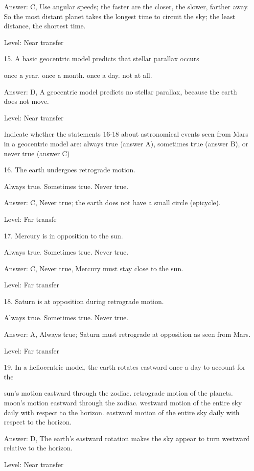Answer: C, Use angular speeds; the faster are the closer, the slower, farther away. So the most distant planet takes the longest time to circuit the sky; the least distance, the shortest time.

Level: Near transfer

15. A basic geocentric model predicts that stellar parallax occurs

    once a year.
    once a month.
    once a day.
    not at all. 

Answer: D, A geocentric model predicts no stellar parallax, because the earth does not move.

Level: Near transfer

Indicate whether the statements 16-18 about astronomical events seen from Mars in a geocentric model are: always true (answer A), sometimes true (answer B), or never true (answer C)

16. The earth undergoes retrograde motion.

    Always true.
    Sometimes true.
    Never true. 

Answer: C, Never true; the earth does not have a small circle (epicycle).

Level: Far transfe

17. Mercury is in opposition to the sun.

    Always true.
    Sometimes true.
    Never true. 

Answer: C, Never true, Mercury must stay close to the sun.

Level: Far transfer

18. Saturn is at opposition during retrograde motion.

    Always true.
    Sometimes true.
    Never true. 

Answer: A, Always true; Saturn must retrograde at opposition as seen from Mars.

Level: Far transfer

19. In a heliocentric model, the earth rotates eastward once a day to account for the

    sun's motion eastward through the zodiac.
    retrograde motion of the planets.
    moon's motion eastward through the zodiac.
    westward motion of the entire sky daily with respect to the horizon.
    eastward motion of the entire sky daily with respect to the horizon. 

Answer: D, The earth's eastward rotation makes the sky appear to turn westward relative to the horizon.

Level: Near transfer

